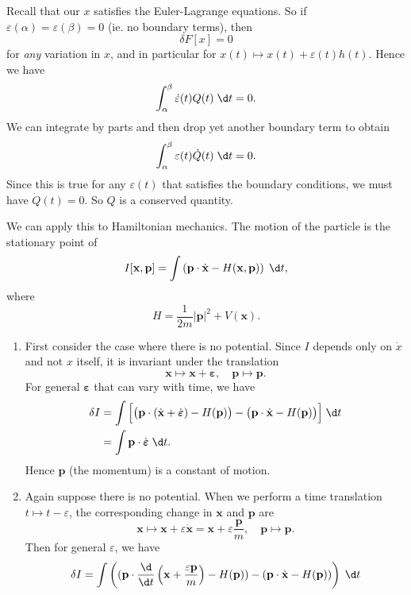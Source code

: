 \documentclass[a4paper]{article}
\begin{document}
Recall that our $x$ satisfies the Euler-Lagrange equations. So if $\varepsilon(\alpha) = \varepsilon(\beta) = 0$ (ie. no boundary terms), then
\[
  \delta F[x] = 0
\]
for \emph{any} variation in $x$, and in particular for $x(t) \mapsto x(t) + \varepsilon(t) h(t)$. Hence we have
\[
  \int_\alpha^\beta \dot{\varepsilon}(t)Q(t)\;\d t = 0.
\]
We can integrate by parts and then drop yet another boundary term to obtain
\[
  \int_\alpha^\beta \varepsilon(t)\dot{Q}(t)\;\d t = 0.
\]
Since this is true for any $\varepsilon(t)$ that satisfies the boundary conditions, we must have $\dot{Q}(t) = 0$. So $Q$ is a conserved quantity.

\begin{eg}
  We can apply this to Hamiltonian mechanics. The motion of the particle is the stationary point of
  \[
    I[\mathbf{x}, \mathbf{p}] = \int \left(\mathbf{p}\cdot \dot{\mathbf{x}} - H(\mathbf{x}, \mathbf{p})\right)\;\d t,
  \]
  where
  \[
    H = \frac{1}{2m} |\mathbf{p}|^2 + V(\mathbf{x}).
  \]
  \begin{enumerate}
    \item First consider the case where there is no potential. Since $I$ depends only on $\dot{x}$ and not $x$ itself, it is invariant under the translation
      \[
        \mathbf{x}\mapsto \mathbf{x} + \boldsymbol\varepsilon,\quad \mathbf{p}\mapsto \mathbf{p}.
      \]
      For general $\boldsymbol\varepsilon$ that can vary with time, we have
      \begin{align*}
        \delta I &= \int \Big[\big(\mathbf{p}\cdot (\dot{\mathbf{x}} + \dot{\boldsymbol\varepsilon}) - H(\mathbf{p})\big) - \big(\mathbf{p}\cdot \dot{\mathbf{x}} - H(\mathbf{p})\big)\Big]\;\d t\\
        &= \int \mathbf{p}\cdot \dot{\boldsymbol\varepsilon}\;\d t.
      \end{align*}
      Hence $\mathbf{p}$ (the momentum) is a constant of motion.
    \item Again suppose there is no potential. When we perform a time translation $t \mapsto t - \varepsilon$, the corresponding change in $\mathbf{x}$ and $\mathbf{p}$ are
      \[
        \mathbf{x}\mapsto \mathbf{x} + \varepsilon \dot{\mathbf{x}} = \mathbf{x} + \varepsilon \frac{\mathbf{p}}{m},\quad \mathbf{p}\mapsto \mathbf{p}.
      \]
      Then for general $\varepsilon$, we have
      \begin{align*}
        \delta I &= \int \left((\mathbf{p}\cdot \frac{\d}{\d t}\left(\mathbf{x} + \frac{\varepsilon \mathbf{p}}{m}\right) - H(\mathbf{p})) - (\mathbf{p}\cdot \dot{\mathbf{x}} - H(\mathbf{p}))\right)\;\d t\\

\end{align*}
\end{enumerate}
\end{eg}
\end{document}
